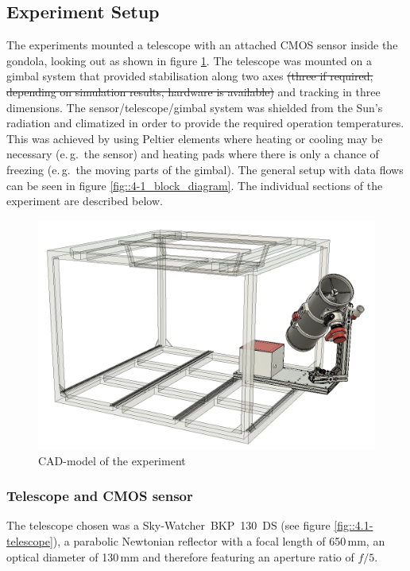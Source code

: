 \subsection{Experiment Setup} \label{Experiment_Setup}




The experiments mounted a telescope with an attached CMOS sensor inside the gondola, looking out as shown in figure \ref{fig::4-1_CAD}. The telescope was mounted on a gimbal system that provided stabilisation along two axes \st{(three if required, depending on simulation results, hardware is available)} and tracking in three dimensions. The sensor/telescope/gimbal system was shielded from the Sun's radiation and climatized in order to provide the required operation temperatures. This was achieved by using Peltier elements where heating or cooling may be necessary (e.\,g.~the sensor) and heating pads where there is only a chance of freezing (e.\,g.~the moving parts of the gimbal). The general setup with data flows can be seen in figure \ref{fig::4-1_block_diagram}. The individual sections of the experiment are described below.

\begin{figure}[h]
	\centering
	\includegraphics[width=0.7\linewidth]{4-experiment-design/img/mechanical/iso0.png}
	\caption{CAD-model of the experiment}
	\label{fig::4-1_CAD}
\end{figure}


\subsubsection{Telescope and CMOS sensor}
The telescope chosen was a Sky-Watcher~BKP~130~DS (see figure \ref{fig::4.1-telescope}), a parabolic Newtonian reflector with a focal length of 650\,mm, an optical diameter of 130\,mm and therefore featuring an aperture ratio of $f/5$. 

